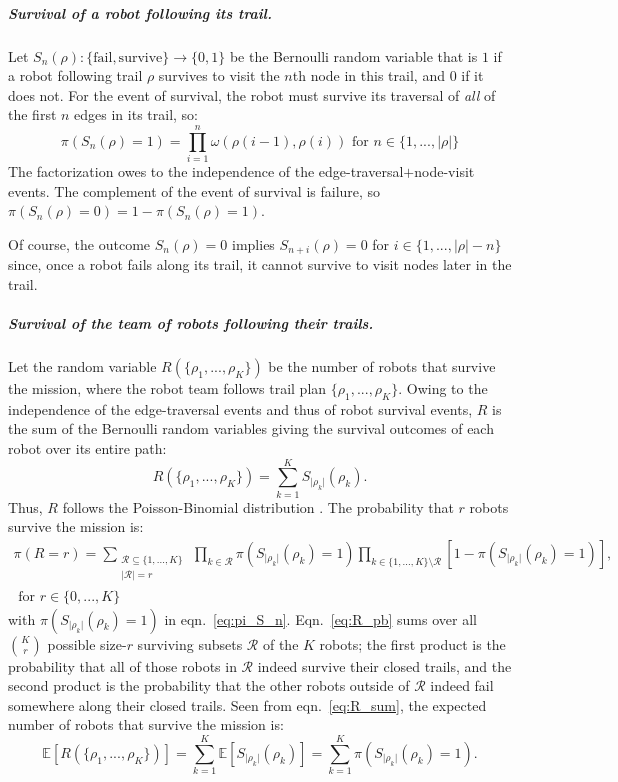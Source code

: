 \documentclass[11pt, oneside]{article}
\begin{document}
\subparagraph{Survival of a robot following its trail.}
Let $S_n(\rho) : \{\text{fail}, \text{survive}\} \rightarrow \{0, 1\} $ be the Bernoulli random variable that is $1$ if a robot following trail $\rho$ survives to visit the $n$th node in this trail, and $0$ if it does not. For the event of survival, the robot must survive its traversal of \emph{all} of the first $n$ edges in its trail, so:
\begin{equation}
	\pi(S_n(\rho) = 1) = \prod_{i=1}^n \omega(\rho(i-1), \rho(i)) \text{ for } n\in \{1, ..., \lvert \rho \rvert\} \label{eq:pi_S_n}
\end{equation} The factorization owes to the independence of the edge-traversal$+$node-visit events.
The complement of the event of survival is failure, so $\pi(S_n(\rho) = 0)=1-\pi(S_n(\rho) = 1)$.

Of course, the outcome $S_n(\rho)=0$ implies $S_{n+i}(\rho)=0$ for $i \in \{1, ..., \lvert \rho \rvert - n\}$ since, once a robot fails along its trail, it cannot survive to visit nodes later in the trail.

\subparagraph{Survival of the team of robots following their trails.}
Let the random variable $R(\{\rho_1, ..., \rho_K\})$ be the number of robots that survive the mission, where the robot team follows trail plan $\{\rho_1, ..., \rho_K\}$. Owing to the independence of the edge-traversal events and thus of robot survival events, $R$ is the sum of the Bernoulli random variables giving the survival outcomes of each robot over its entire path:
\begin{equation}
	R(\{\rho_1, ..., \rho_K\})=\sum_{k=1}^K S_{\lvert \rho_k \rvert}(\rho_k). \label{eq:R_sum}
\end{equation}
Thus, $R$ follows the Poisson-Binomial distribution \cite{tang2023poisson}.
The probability that $r$ robots survive the mission is:
\begin{multline}
	\pi(R=r) = \sum_{\substack{\mathcal{R} \subseteq \{1, ..., K\}  \\ \lvert \mathcal{R} \rvert = r} } \,
	\prod_{k \in \mathcal{R}} \pi(S_{\lvert \rho_k \rvert}(\rho_k) = 1)
	\prod_{k \in \{1, ..., K\} \setminus \mathcal{R}} [1- \pi(S_{\lvert \rho_k \rvert}(\rho_k) = 1)], \\ \text{ for } r \in \{0, ..., K\}
	\label{eq:R_pb}
\end{multline} with $ \pi(S_{\lvert \rho_k \rvert}(\rho_k) = 1)$ in eqn.~\ref{eq:pi_S_n}.
Eqn.~\ref{eq:R_pb} sums over all $\binom{K}{r}$ possible size-$r$ surviving subsets $\mathcal{R}$ of the $K$ robots; the first product is the probability that all of those robots in $\mathcal{R}$ indeed survive their closed trails, and the second product is the probability that the other robots outside of $\mathcal{R}$ indeed fail somewhere along their closed trails.
Seen from eqn.~\ref{eq:R_sum}, the expected number of robots that survive the mission is:
\begin{equation}
	\mathbb{E}[R(\{\rho_1, ..., \rho_K\})]=\sum_{k=1}^K \mathbb{E}[S_{\lvert \rho_k \rvert}(\rho_k)] = \sum_{k=1}^K  \pi(S_{\lvert \rho_k \rvert}(\rho_k) = 1).
\end{equation}
\end{document}
